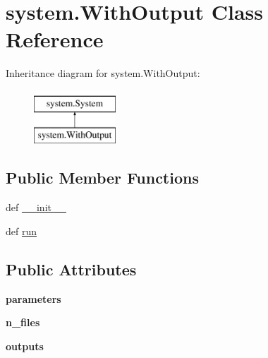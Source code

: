 \hypertarget{classsystem_1_1WithOutput}{\section{system.\-With\-Output Class Reference}
\label{classsystem_1_1WithOutput}
}
Inheritance diagram for system.\-With\-Output\-:\begin{figure}[H]
\begin{center}
\leavevmode
\includegraphics[height=2.000000cm]{dd/d44/classsystem_1_1WithOutput}
\end{center}
\end{figure}
\subsection*{Public Member Functions}
\begin{DoxyCompactItemize}
\item 
def \hyperlink{classsystem_1_1WithOutput_a60b38b97c97568583fc2cf54cb7e8678}{\-\_\-\-\_\-init\-\_\-\-\_\-}
\item 
def \hyperlink{classsystem_1_1WithOutput_abeb008bf9930662467931e61a741b763}{run}
\end{DoxyCompactItemize}
\subsection*{Public Attributes}
\begin{DoxyCompactItemize}
\item 
\hypertarget{classsystem_1_1WithOutput_af6dac20f0117ff620ec5d157ff223377}{{\bfseries parameters}}\label{classsystem_1_1WithOutput_af6dac20f0117ff620ec5d157ff223377}

\item 
\hypertarget{classsystem_1_1WithOutput_a272fee7b8df6177d883f0d257628eeff}{{\bfseries n\-\_\-files}}\label{classsystem_1_1WithOutput_a272fee7b8df6177d883f0d257628eeff}

\item 
\hypertarget{classsystem_1_1WithOutput_adc7afae162437b6c0e4d15434e6ac625}{{\bfseries outputs}}\label{classsystem_1_1WithOutput_adc7afae162437b6c0e4d15434e6ac625}

\end{DoxyCompactItemize}


